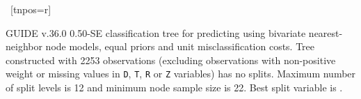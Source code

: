 \documentclass[12pt]{article}
\begin{document}
 \begin{center}
    ~[tnpos=r]{}
    ~{}
 \end{center}
GUIDE v.36.0 0.50-SE
classification tree for predicting \texttt{} using
bivariate nearest-neighbor node models,
equal priors
and unit misclassification costs.
 Tree constructed with 2253 observations
 (excluding observations with non-positive weight or missing values
 in \texttt{D}, \texttt{T}, \texttt{R} or \texttt{Z} variables) has no splits.
 Maximum number of split levels is 12 and minimum node sample size is 22.
 Best split variable is \texttt{}.
 
\end{document}
